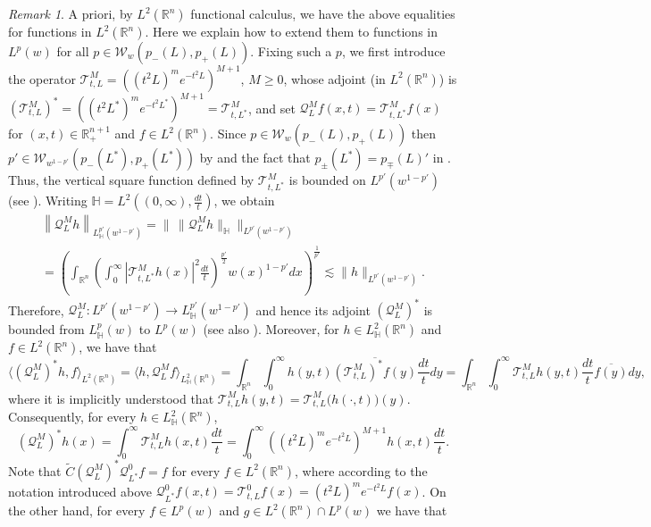 \documentclass[11pt, a4paper,leqno]{amsart}
\theoremstyle{plain}
\theoremstyle{definition}
\theoremstyle{remark}
\newtheorem{remark}[equation]{Remark}
\numberwithin{equation}{section}
\def \R{ \mathbb{R} }
\begin{document}
\begin{remark}\label{remark:calderonreproducing}
A priori, by $L^2(\R^n)$ functional calculus, we have the above equalities for functions in $L^2(\R^n)$. Here we explain how to extend them to functions in $L^p(w)$ for all $p\in \mathcal{W}_w(p_-(L),p_+(L))$. Fixing such a $p$, we first introduce the operator $\mathcal{T}_{t,L}^M= ((t^2 L)^m e^{-t^2 L})^{M+1}$, $M\ge 0$, whose adjoint (in $L^2(\R^n)$) is $(\mathcal{T}_{t, L}^M)^*= ((t^2 L^*)^m e^{-t^2 L^*})^{M+1}=\mathcal{T}_{t, L^*}^M$, and set $\mathcal{Q}_L^M f(x,t)= \mathcal{T}_{t, L^*}^Mf(x)$ for $(x,t)\in \mathbb{R}^{n+1}_+$ and $f\in L^2(\R^n)$.
Since $p\in \mathcal{W}_w(p_-(L),p_+(L))$ then $p'\in \mathcal{W}_{w^{1-p'}}(p_-(L^*),p_+(L^*))$  by \cite[Lemma 4.4]{AuscherMartell:I} and the fact that $p_{\pm}(L^*)=p_{\mp}(L)'$ in \cite{Auscher}. Thus,  the vertical square function defined by $\mathcal{T}_{t, L^*}^M$ is bounded on $L^{p'}(w^{1-p'})$ (see \cite{AuscherMartell:III}). Writing $\mathbb{H}=L^2\left((0,\infty),\frac{dt}{t}\right)$, we obtain 
\begin{multline}\label{eq:QLM-SF}
\left\|\mathcal{Q}_L^M h\right\|_{L^{p'}_{\mathbb{H}}(w^{1-p'})}
=
\big\|\,\|\mathcal{Q}_L^M h\|_{\mathbb{H}}\big\|_{L^{p'}(w^{1-p'})}
\\
=
\left(\int_{\R^n}\left(\int_0^{\infty}|\mathcal{T}_{t, L^*}^M h(x)|^2\frac{dt}{t}\right)^{\frac{p'}{2}}w(x)^{1-p'}dx\right)^{\frac{1}{p'}}
\lesssim 
\|h\|_{L^{p'}(w^{1-p'})}.
\end{multline}
Therefore, $\mathcal{Q}_L^M:L^{p'}(w^{1-p'})\rightarrow L^{p'}_{\mathbb{H}}(w^{1-p'})$ and hence its adjoint $(\mathcal{Q}_L^M)^*$ is bounded from $L^{p}_{\mathbb{H}}(w)$ to $L^{p}(w)$ (see also \cite{Auscher,AuscherMartell:III}). Moreover, for $h\in L^{2}_{\mathbb{H}}(\R^n)$ and $f\in L^2(\R^n)$, we have that
$$
\langle (\mathcal{Q}_L^M)^* h, f \rangle_{L^2(\R^n)}
=
\langle h, \mathcal{Q}_L^M  f \rangle_{L^2_{\mathbb{H}}(\R^n)}
=
\int_{\mathbb{R}^n}\int_0^\infty h(y,t) \overline{(\mathcal{T}_{t, L}^M)^*f(y)}\frac{dt}{t}dy
=
\int_{\mathbb{R}^n}\int_0^\infty \mathcal{T}_{t, L}^M h(y,t) \frac{dt}{t} \overline{f(y)} dy,
$$
where it is implicitly understood that $\mathcal{T}_{t, L}^M h(y,t)=\mathcal{T}_{t, L}^M \big(h(\cdot,t)\big)(y)$. Consequently, for every $h\in {L^2_{\mathbb{H}}(\R^n)}$,
$$
(\mathcal{Q}_L^M)^*h(x)
=
\int_0^{\infty} \mathcal{T}_{t, L}^M h(x,t)\frac{dt}{t}
=
\int_0^{\infty} ((t^2 L)^m e^{-t^2 L})^{M+1} h(x,t)\frac{dt}{t}.
$$
Note that $\widetilde{C}(\mathcal{Q}_L^M)^*  \mathcal{Q}_{L^*}^0 f=f$ for every $f\in L^2(\R^n)$, where according to the notation introduced above $\mathcal{Q}_{L^*}^0f(x,t)= \mathcal{T}_{t, L}^0f(x)=(t^2 L)^m e^{-t^2 L}f(x)$. On the other hand, for every $f\in  L^p(w)$ and $g\in L^2(\R^n)\cap L^p(w)$ we have that

\end{remark}
\end{document}
